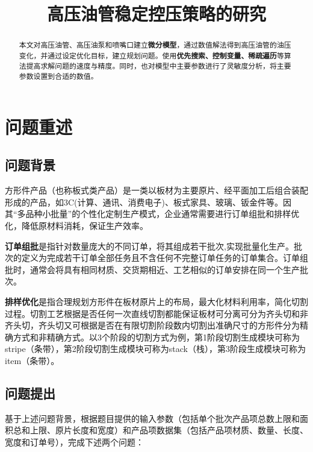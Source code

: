 \documentclass[bwprint]{gmcmthesis}
\title{高压油管稳定控压策略的研究}
\begin{document}
 \maketitle

\begin{abstract}
本文对高压油管、高压油泵和喷嘴口建立\textbf{微分模型}，通过数值解法得到高压油管的油压变化，并通过设定优化目标，建立规划问题。使用\textbf{优先搜索、控制变量、稀疏遍历}等算法提高求解问题的速度与精度。同时，也对模型中主要参数进行了灵敏度分析，将主要参数设置到合适的数值。

\end{abstract}

\pagestyle{plain}

\section{问题重述}

\subsection{问题背景}

方形件产品（也称板式类产品）是一类以板材为主要原片、经平面加工后组合装配形成的产品，如3C(计算、通讯、消费电子)、板式家具、玻璃、钣金件等。因其“多品种小批量”的个性化定制生产模式，企业通常需要进行订单组批和排样优化，降低原材料消耗，保证生产效率。


\textbf{订单组批}是指针对数量庞大的不同订单，将其组成若干批次,实现批量化生产。批次的定义为完成若干订单全部任务且不含任何不完整订单任务的订单集合。订单组批时，通常会将具有相同材质、交货期相近、工艺相似的订单安排在同一个生产批次。


\textbf{排样优化}是指合理规划方形件在板材原片上的布局，最大化材料利用率，简化切割过程。切割工艺根据是否任何一次直线切割都能保证板材可分离可分为齐头切和非齐头切，齐头切又可根据是否在有限切割阶段数内切割出准确尺寸的方形件分为精确方式和非精确方式。以3个阶段的切割方式为例，第1阶段切割生成模块可称为stripe（条带），第2阶段切割生成模块可称为stack（栈），第3阶段生成模块可称为item（条带）。


\quad


\subsection{问题提出}
基于上述问题背景，根据题目提供的输入参数（包括单个批次产品项总数上限和面积总和上限、原片长度和宽度）和产品项数据集（包括产品项材质、数量、长度、宽度和订单号），完成下述两个问题：
\end{document}
